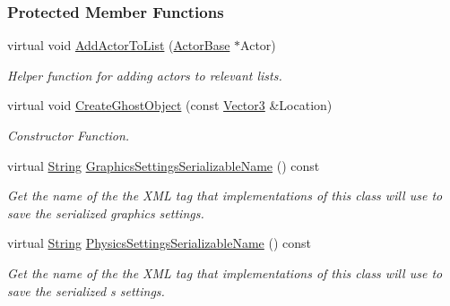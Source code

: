 \subsubsection*{Protected Member Functions}
\begin{DoxyCompactItemize}
\item 
\hypertarget{classMezzanine_1_1AreaEffect_a4a81d9d5920f375aa9a5ff27c1de97e0}{
virtual void \hyperlink{classMezzanine_1_1AreaEffect_a4a81d9d5920f375aa9a5ff27c1de97e0}{AddActorToList} (\hyperlink{classMezzanine_1_1ActorBase}{ActorBase} $\ast$Actor)}
\label{classMezzanine_1_1AreaEffect_a4a81d9d5920f375aa9a5ff27c1de97e0}

\begin{DoxyCompactList}\small\item\em Helper function for adding actors to relevant lists. \item\end{DoxyCompactList}\item 
virtual void \hyperlink{classMezzanine_1_1AreaEffect_a198ad58cec706d508785cbd8e319ba54}{CreateGhostObject} (const \hyperlink{classMezzanine_1_1Vector3}{Vector3} \&Location)
\begin{DoxyCompactList}\small\item\em Constructor Function. \item\end{DoxyCompactList}\item 
virtual \hyperlink{namespaceMezzanine_acf9fcc130e6ebf08e3d8491aebcf1c86}{String} \hyperlink{classMezzanine_1_1AreaEffect_ae93ea4e6554abb1afc919322c6c7e352}{GraphicsSettingsSerializableName} () const 
\begin{DoxyCompactList}\small\item\em Get the name of the the XML tag that implementations of this class will use to save the serialized graphics settings. \item\end{DoxyCompactList}\item 
virtual \hyperlink{namespaceMezzanine_acf9fcc130e6ebf08e3d8491aebcf1c86}{String} \hyperlink{classMezzanine_1_1AreaEffect_adb8b3c92f78a8b070be9fa22f87e9f9d}{PhysicsSettingsSerializableName} () const 
\begin{DoxyCompactList}\small\item\em Get the name of the the XML tag that implementations of this class will use to save the serialized s settings. \item\end{DoxyCompactList}\item 

\end{DoxyCompactItemize}
